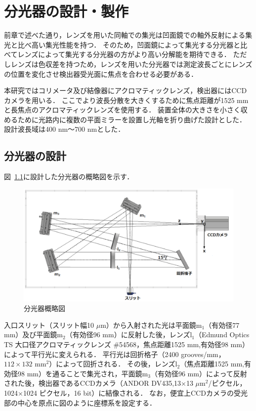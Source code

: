 \chapter{分光器の設計・製作}
前章で述べた通り，レンズを用いた同軸での集光は凹面鏡での軸外反射による集光と比べ高い集光性能を持つ．
そのため，凹面鏡によって集光する分光器と比べてレンズによって集光する分光器の方がより高い分解能を期待できる．
ただしレンズは色収差を持つため，レンズを用いた分光器では測定波長ごとにレンズの位置を変化させ検出器受光面に焦点を合わせる必要がある．

本研究ではコリメータ及び結像器にアクロマティックレンズ，検出器にはCCDカメラを用いる．
ここでより波長分散を大きくするために焦点距離が1525 mmと長焦点のアクロマティックレンズを使用する．
装置全体の大きさを小さく収めるために光路内に複数の平面ミラーを設置し光軸を折り曲げた設計とした．
設計波長域は400 nm～700 nmとした．

\section{分光器の設計}
\label{sec:spectrometer_design}
図\ \ref{fig:spectrometer_design}に設計した分光器の概略図を示す．
\begin{figure}[htbp]
    \centering
    \includegraphics[scale=0.55]{figure/spectrometer_design2.pdf}
    \caption{分光器概略図}
    \label{fig:spectrometer_design}
\end{figure}
入口スリット（スリット幅10 $\mu$m）から入射された光は平面鏡$\mathrm{m_1}$（有効径77 mm）及び平面鏡$\mathrm{m_2}$（有効径96 mm）に反射した後，レンズ$\mathrm{l_1}$（Edmund Optics TS 大口径アクロマティックレンズ $\#$54568，焦点距離1525 mm,有効径98 mm）によって平行光に変えられる．
平行光は回折格子（2400 grooves/mm，$112\times132$ $\mathrm{mm^{2}}$）によって回折される．
その後，レンズ$\mathrm{l_2}$（焦点距離1525 mm,有効径98 mm）を通ることで集光され，平面鏡$\mathrm{m_3}$（有効径96 mm）によって反射された後，検出器であるCCDカメラ（ANDOR DV435,13×13 $\mu\mathrm{m^{2}}$/ピクセル，1024×1024 ピクセル，16 bit）に結像される．
なお，便宜上CCDカメラの受光部の中心を原点に図のように座標系を設定する．


